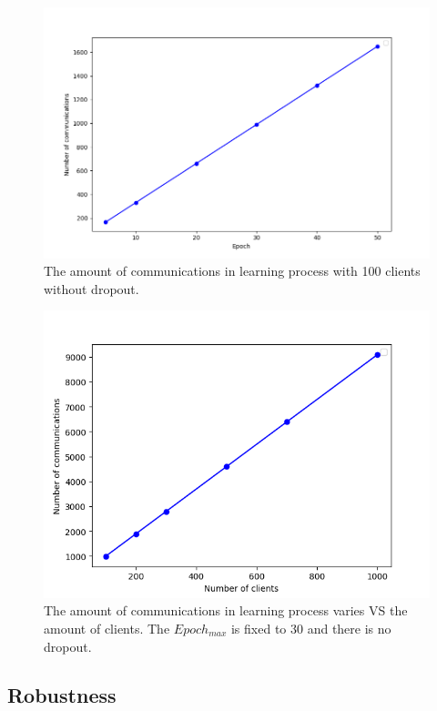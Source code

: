 \begin{figure}[!ht]
    \centering
    \includegraphics[width=\columnwidth]{img/comm-epoch.png}
    \caption{The amount of communications in learning process with 100 clients without dropout.}
    \label{comm-epoch}
\end{figure}

\begin{figure}[!ht]
    \centering
    \includegraphics[width=\columnwidth]{img/comm-client.png}
    \caption{The amount of communications in learning process varies VS  the amount of clients. The $Epoch_{max}$ is fixed to 30 and there is no dropout.}
    \label{comm-client}
\end{figure}


\subsection{Robustness}
